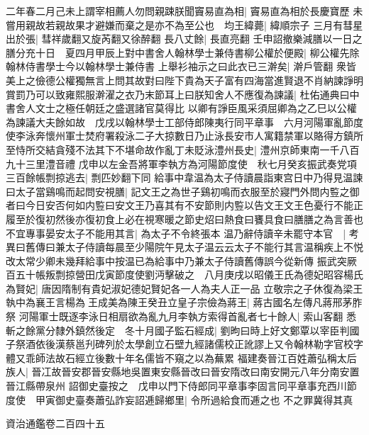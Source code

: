 二年春二月己未上謂宰相薦人勿問親踈朕聞竇易直為相|{
	竇易直為相於長慶寶歷}
未嘗用親故若親故果才避嫌而棄之是亦不為至公也　均王緯薨|{
	緯順宗子}
三月有彗星出於張|{
	彗祥歲翻又旋芮翻又徐醉翻}
長八丈餘|{
	長直亮翻}
壬申詔撤樂減膳以一日之膳分充十日　夏四月甲辰上對中書舍人翰林學士兼侍書柳公權於便殿|{
	柳公權先除翰林侍書學士今以翰林學士兼侍書}
上舉衫袖示之曰此衣已三澣矣|{
	澣戶管翻}
衆皆美上之儉德公權獨無言上問其故對曰陛下貴為天子富有四海當進賢退不肖納諫諍明賞罰乃可以致雍熙服澣濯之衣乃末節耳上曰朕知舍人不應復為諫議|{
	杜佑通典曰中書舍人文士之極任朝廷之盛選諸官莫得比}
以卿有諍臣風采須屈卿為之乙巳以公權為諫議大夫餘如故　戊戌以翰林學士工部侍郎陳夷行同平章事　六月河陽軍亂節度使李泳奔懷州軍士焚府署殺泳二子大掠數日乃止泳長安市人寓籍禁軍以賂得方鎮所至恃所交結貪殘不法其下不堪命故作亂丁未貶泳澧州長史|{
	澧州京師東南一千八百九十三里澧音禮}
戊申以左金吾將軍李執方為河陽節度使　秋七月癸亥振武奏党項三百餘帳剽掠逃去|{
	剽匹妙翻下同}
給事中韋温為太子侍讀晨詣東宫日中乃得見温諫曰太子當鷄鳴而起問安視膳|{
	記文王之為世子鷄初鳴而衣服至於寢門外問内䜿之御者曰今日安否何如内䜿曰安文王乃喜其有不安節則内䜿以告文王文王色憂行不能正履至於復初然後亦復初食上必在視寒暖之節史炤曰熱食曰饔具食曰膳膳之為言善也}
不宜專事晏安太子不能用其言|{
	為太子不令終張本}
温乃辭侍讀辛未罷守本官　|{
	考異曰舊傳曰兼太子侍讀每晨至少陽院午見太子温云云太子不能行其言温稱疾上不悦改太常少卿未幾拜給事中按温已為給事中乃兼太子侍讀舊傳誤今從新傳}
振武突厥百五十帳叛剽掠營田戊寅節度使劉沔擊破之　八月庚戌以昭儀王氏為德妃昭容楊氏為賢妃|{
	唐因隋制有貴妃淑妃德妃賢妃各一人為夫人正一品}
立敬宗之子休復為梁王執中為襄王言楊為王成美為陳王癸丑立皇子宗儉為蔣王|{
	蔣古國名左傳凡蔣邢茅胙祭}
河陽軍士既逐李泳日相扇欲為亂九月李執方索得首亂者七十餘人|{
	索山客翻}
悉斬之餘黨分隸外鎮然後定　冬十月國子監石經成|{
	劉昫曰時上好文鄭覃以宰臣判國子祭酒依後漢蔡邕刋碑列於太學創立石壁九經諸儒校正訛謬上又令翰林勒字官校字體又乖師法故石經立後數十年名儒皆不窺之以為蕪累}
福建奏晉江百姓蕭弘稱太后族人|{
	晉冮故晉安郡晉安縣地吳置東安縣晉改曰晉安隋改曰南安開元八年分南安置晉江縣帶泉州}
詔御史臺按之　戊申以門下侍郎同平章事李固言同平章事充西川節度使　甲寅御史臺奏蕭弘詐妄詔逓歸鄉里|{
	令所過給食而逓之也}
不之罪冀得其真

資治通鑑卷二百四十五
